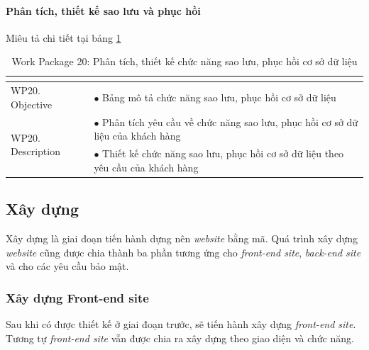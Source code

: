 \documentclass[a4paper]{book}
\begin{document}
\paragraph{Phân tích, thiết kế sao lưu và phục hồi} Miêu tả chi tiết tại bảng \ref{table:baomat_thietke_saoluu}
\begin{table}[h!]
	\begin{center}
		\begin{tabular}{|p{4cm}|p{10cm}|}
			\hline
			\multicolumn{2}{|c|}{\cellcolor[HTML]{363636}{\color[HTML]{FFFFFF}Work package 20: Phân tích, thiết kế chức năng sao lưu, phục hồi cơ sở dữ liệu}}\\
			\hline
			\multirow{1}{*}{WP20. Objective} & $\bullet$ Bảng mô tả chức năng sao lưu, phục hồi cơ sở dữ liệu\\
			\hline
			\multirow{2}{*}{WP20. Description} & $\bullet$ Phân tích yêu cầu về chức năng sao lưu, phục hồi cơ sở dữ liệu của khách hàng \\
			& $\bullet$ Thiết kế chức năng sao lưu, phục hồi cơ sở dữ liệu theo yêu cầu của khách hàng\\
			\hline
		\end{tabular}
		\caption{Work Package 20: Phân tích, thiết kế chức năng sao lưu, phục hồi cơ sở dữ liệu}
		\label{table:baomat_thietke_saoluu}
	\end{center}
\end{table}
\subsection{Xây dựng}
Xây dựng là giai đoạn tiến hành dựng nên \textit{website} bằng mã. Quá trình xây dựng \textit{website} cũng được chia thành ba phần tương ứng cho \textit{front-end site}, \textit{back-end site} và cho các yêu cầu bảo mật.
\subsubsection{Xây dựng Front-end site}
Sau khi có được thiết kế ở giai đoạn trước, sẽ tiến hành xây dựng \textit{front-end site}. Tương tự \textit{front-end site} vẫn được chia ra xây dựng theo giao diện và chức năng.
\end{document}
